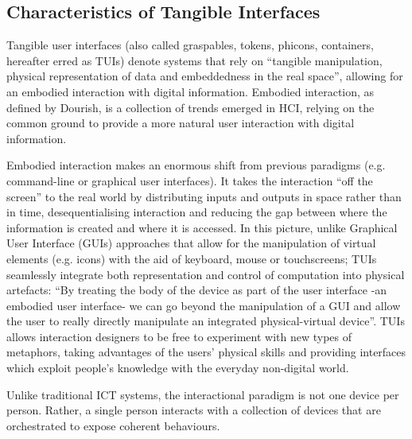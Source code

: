 \subsection{Characteristics of Tangible Interfaces}
Tangible user interfaces (also called graspables, tokens, phicons, containers, hereafter erred as TUIs) denote systems that rely on ``tangible manipulation, physical representation of data and embeddedness in the real space'', allowing for an embodied interaction with digital information. Embodied interaction, as defined by Dourish\cite{dourish_where_2004}, is a collection of trends emerged in HCI, relying on the common ground to provide a more natural user interaction with digital information.

Embodied interaction makes an enormous shift from previous paradigms (e.g. command-line or graphical user interfaces). It takes the interaction ``off the screen'' to the real world by distributing inputs and outputs in space rather than in time, desequentialising interaction and reducing the gap between where the information is created and where it is accessed. In this picture, unlike Graphical User Interface (GUIs) approaches that allow for the manipulation of virtual elements (e.g. icons) with the aid of keyboard, mouse or touchscreens; TUIs seamlessly integrate both representation and control of computation into physical artefacts: ``By treating the body of the device as part of the user interface -an embodied user interface- we can go beyond the manipulation of a GUI and allow the user to really directly manipulate an integrated physical-virtual device''. TUIs allows interaction designers to be free to experiment with new types of metaphors, taking advantages of the users' physical skills and providing interfaces which exploit people's knowledge with the everyday non-digital world.

Unlike traditional ICT systems, the interactional paradigm is not one device per person. Rather, a single person interacts with a collection of devices that are orchestrated to expose coherent behaviours.